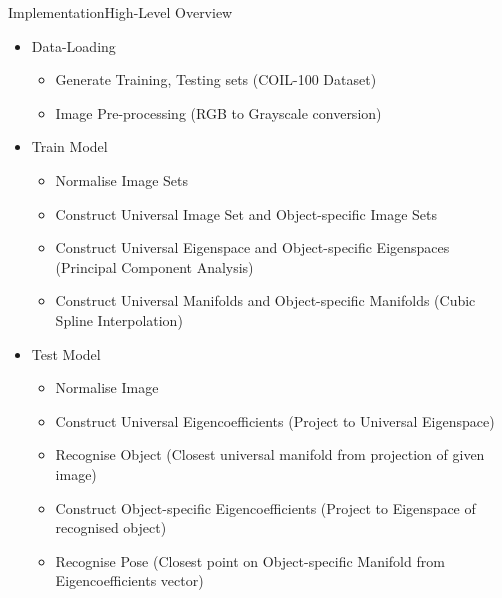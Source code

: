 \documentclass[aspectratio=169, handout, 10pt, hyperref=colorlinks]{beamer}
\begin{document}
\begin{frame}{Implementation}{High-Level Overview}
\begin{itemize}
    \item Data-Loading
        \begin{itemize}
            \item Generate Training, Testing sets (COIL-100 Dataset)
            \item Image Pre-processing (RGB to Grayscale conversion)
        \end{itemize}
    \item Train Model
    \begin{itemize}
    \item Normalise Image Sets
    \item Construct Universal Image Set and Object-specific Image Sets
    \item Construct Universal Eigenspace and Object-specific Eigenspaces (Principal Component Analysis)
    \item Construct Universal Manifolds and Object-specific Manifolds (Cubic Spline Interpolation)
    \end{itemize}
    \item Test Model
    \begin{itemize}
    \item Normalise Image
    \item Construct Universal Eigencoefficients (Project to Universal Eigenspace)
    \item Recognise Object (Closest universal manifold from projection of given image)
    \item Construct Object-specific Eigencoefficients (Project to Eigenspace of recognised object)
    \item Recognise Pose (Closest point on Object-specific Manifold from Eigencoefficients vector)
    \end{itemize}
\end{itemize}
\end{frame}
\end{document}
